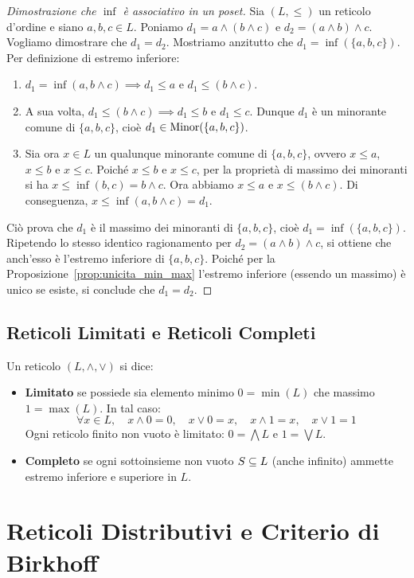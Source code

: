 \begin{proof}[Dimostrazione che $\inf$ è associativo in un poset]
Sia $(L, \le)$ un reticolo d'ordine e siano $a, b, c \in L$.
Poniamo $d_1 = a \wedge (b \wedge c)$ e $d_2 = (a \wedge b) \wedge c$. Vogliamo dimostrare che $d_1 = d_2$.
Mostriamo anzitutto che $d_1 = \inf(\{a, b, c\})$.
Per definizione di estremo inferiore:
\begin{enumerate}
    \item $d_1 = \inf(a, b \wedge c) \implies d_1 \le a$ e $d_1 \le (b \wedge c)$.
    \item A sua volta, $d_1 \le (b \wedge c) \implies d_1 \le b$ e $d_1 \le c$.
    Dunque $d_1$ è un minorante comune di $\{a, b, c\}$, cioè $d_1 \in \operatorname{Minor}(\{a, b, c\})$.
    \item Sia ora $x \in L$ un qualunque minorante comune di $\{a, b, c\}$, ovvero $x \le a$, $x \le b$ e $x \le c$.
    Poiché $x \le b$ e $x \le c$, per la proprietà di massimo dei minoranti si ha $x \le \inf(b, c) = b \wedge c$.
    Ora abbiamo $x \le a$ e $x \le (b \wedge c)$. Di conseguenza, $x \le \inf(a, b \wedge c) = d_1$.
\end{enumerate}
Ciò prova che $d_1$ è il massimo dei minoranti di $\{a, b, c\}$, cioè $d_1 = \inf(\{a, b, c\})$.
Ripetendo lo stesso identico ragionamento per $d_2 = (a \wedge b) \wedge c$, si ottiene che anch'esso è l'estremo inferiore di $\{a, b, c\}$.
Poiché per la Proposizione~\ref{prop:unicita_min_max} l'estremo inferiore (essendo un massimo) è unico se esiste, si conclude che $d_1 = d_2$.
\end{proof}

\subsection{Reticoli Limitati e Reticoli Completi}
Un reticolo $(L, \wedge, \vee)$ si dice:
\begin{itemize}
    \item \textbf{Limitato} se possiede sia elemento minimo $0 = \min(L)$ che massimo $1 = \max(L)$. In tal caso:
    \[
        \forall x \in L, \quad x \wedge 0 = 0, \quad x \vee 0 = x, \quad x \wedge 1 = x, \quad x \vee 1 = 1
    \]
    Ogni reticolo finito non vuoto è limitato: $0 = \bigwedge L$ e $1 = \bigvee L$.
    \item \textbf{Completo} se ogni sottoinsieme non vuoto $S \subseteq L$ (anche infinito) ammette estremo inferiore e superiore in $L$.
\end{itemize}

\section{Reticoli Distributivi e Criterio di Birkhoff}

